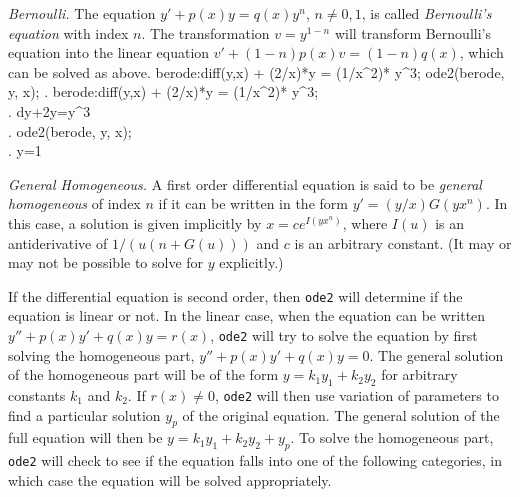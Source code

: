 \smallskip

\noindent
\textit{Bernoulli.}\quad
The equation $y'+p(x)y=q(x)y^n$, $n \ne 0,1$, is called
\textit{Bernoulli's equation} with index $n$. The transformation
$v=y^{1-n}$ will transform Bernoulli's equation into the linear
equation $v' + (1-n)p(x)v = (1-n)q(x)$, which can be solved as above. 
\beginmaximasession
berode:diff(y,x) + (2/x)*y = (1/x^2)* y^3;
ode2(berode, y, x);
\maximatexsession
{}.  berode:diff(y,x) + (2/x)*y = (1/x^2)* y^3; \\
.   {{d}}\*y+{{2\*y}}={{y^{3}}} \\
.  ode2(berode, y, x); \\
.   y={{1}} \\
\endmaximasession

\smallskip

\noindent
\textit{General Homogeneous.}\quad
A first order differential equation is said to be \textit{general
  homogeneous} of index $n$ if it can be written in the form $y' =
(y/x)G(yx^n)$.  In this case, a solution is given implicitly by
$x=ce^{I(yx^n)}$, where $I(u)$ is an antiderivative of $1/(u(n+G(u)))$
and $c$ is an arbitrary constant. (It may or may not be possible to
solve for $y$ explicitly.)

\medskip

If the differential equation is second order, then \texttt{ode2} will
determine if the equation is linear or not.  In the linear case,
when the equation can be written $y'' + p(x)y' + q(x)y = r(x)$,
\texttt{ode2} will try to solve the equation by first solving the
homogeneous part, $y'' + p(x)y' + q(x)y = 0$.
The general solution of the homogeneous part
will be of the form $y = k_1y_1 + k_2y_2$ for arbitrary constants $k_1$ and
$k_2$.  If $r(x) \ne 0$, \texttt{ode2} will then use variation of
parameters to find a particular solution $y_p$ of the original
equation.  The general solution of the full equation will then be 
$y=k_1y_1 + k_2y_2 + y_p$.
To solve the homogeneous part, \texttt{ode2} will check to see if the
equation falls into one of the following categories, in which case 
the equation will be solved appropriately.

\medskip

